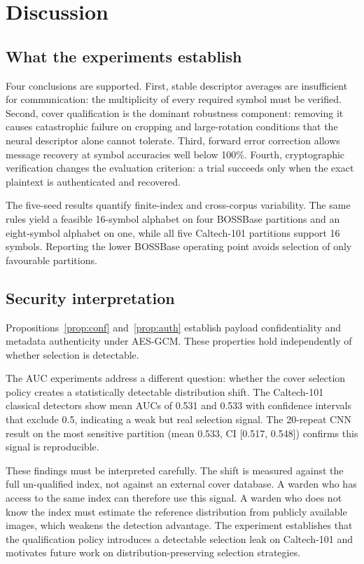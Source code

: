 \documentclass[10pt,journal]{IEEEtran}
\begin{document}
\section{Discussion}
\label{sec:discussion}

\subsection{What the experiments establish}

Four conclusions are supported. First, stable descriptor averages are
insufficient for communication: the multiplicity of every required
symbol must be verified. Second, cover qualification is the dominant
robustness component: removing it causes catastrophic failure on
cropping and large-rotation conditions that the neural descriptor alone
cannot tolerate. Third, forward error correction allows message
recovery at symbol accuracies well below 100\%. Fourth, cryptographic
verification changes the evaluation criterion: a trial succeeds only
when the exact plaintext is authenticated and recovered.

The five-seed results quantify finite-index and cross-corpus
variability. The same rules yield a feasible 16-symbol alphabet on
four BOSSBase partitions and an eight-symbol alphabet on one, while
all five Caltech-101 partitions support 16 symbols. Reporting the
lower BOSSBase operating point avoids selection of only favourable
partitions.

\subsection{Security interpretation}
\label{subsec:security}

Propositions~\ref{prop:conf} and~\ref{prop:auth} establish payload
confidentiality and metadata authenticity under AES-GCM. These
properties hold independently of whether selection is detectable.

The AUC experiments address a different question: whether the cover
selection policy creates a statistically detectable distribution
shift. The Caltech-101 classical detectors show mean AUCs of 0.531
and 0.533 with confidence intervals that exclude 0.5, indicating a
weak but real selection signal. The 20-repeat CNN result on the most
sensitive partition (mean 0.533, CI [0.517, 0.548]) confirms this
signal is reproducible.

These findings must be interpreted carefully. The shift is measured
against the full un-qualified index, not against an external cover
database. A warden who has access to the same index can therefore use
this signal. A warden who does not know the index must estimate the
reference distribution from publicly available images, which weakens
the detection advantage. The experiment establishes that the
qualification policy introduces a detectable selection leak on
Caltech-101 and motivates future work on distribution-preserving
selection strategies.
\end{document}
